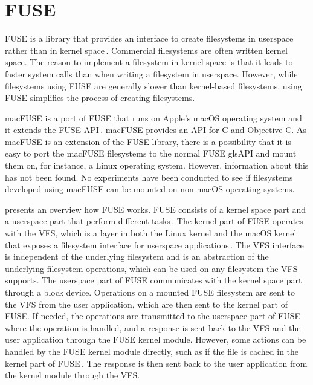 \section{FUSE}
\label{sec:fuse}
\gls{FUSE} is a library that provides an interface to create filesystems in userspace rather than in kernel space\,\cite{Libfuse2021}. Commercial filesystems are often written kernel space. The reason to implement a filesystem in kernel space is that it leads to faster system calls than when writing a filesystem in userspace. However, while filesystems using \gls{FUSE} are generally slower than \mbox{kernel-based} filesystems, using \gls{FUSE} simplifies the process of creating filesystems.

macFUSE is a port of \gls{FUSE} that runs on Apple's macOS operating system and it extends the \gls{FUSE} \gls{API}\,\cite{HomeMacFUSE}. macFUSE provides an \gls{API} for C and Objective C.  As macFUSE is an extension of the \gls{FUSE} library, there is a possibility that it is easy to port the macFUSE filesystems to the normal \gls{FUSE} gls{API} and mount them on, for instance, a Linux operating system. However, information about this has not been found. No experiments have been conducted to see if filesystems developed using macFUSE can be mounted on \mbox{non-macOS} operating systems.

 presents an overview how \gls{FUSE} works. \gls{FUSE} consists of a kernel space part and a userspace part that perform different tasks\,\cite{vangoorFUSENotFUSE2017}. The kernel part of \gls{FUSE} operates with the \gls{VFS}, which is a layer in both the Linux kernel and the macOS kernel that exposes a filesystem interface for userspace applications\,\cite{goochOverviewLinuxVirtual, singhMacOSInternals2006}. The \gls{VFS} interface is independent of the underlying filesystem and is an abstraction of the underlying filesystem operations, which can be used on any filesystem the \gls{VFS} supports. The userspace part of \gls{FUSE} communicates with the kernel space part through a block device. Operations on a mounted \gls{FUSE} filesystem are sent to the \gls{VFS} from the user application, which are then sent to the kernel part of \gls{FUSE}. If needed, the operations are transmitted to the userspace part of \gls{FUSE} where the operation is handled, and a response is sent back to the \gls{VFS} and the user application through the \gls{FUSE} kernel module. However, some actions can be handled by the \gls{FUSE} kernel module directly, such as if the file is cached in the kernel part of \gls{FUSE}\,\cite{vangoorFUSENotFUSE2017}. The response is then sent back to the user application from the kernel module through the \gls{VFS}.

